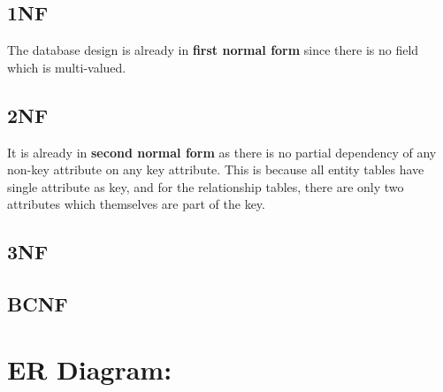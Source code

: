 \documentclass{article}
\begin{document}
\subsection{1NF} The database design is already in \textbf{first normal form} since there is no field which is multi-valued.
\subsection{2NF} It is already in \textbf{second normal form} as there is no partial dependency of any non-key attribute on any key attribute. This is because all entity tables have single attribute as key, and for the relationship tables, there are only two attributes which themselves are part of the key.
\subsection{3NF} 
\subsection{BCNF} 

\section{ER Diagram:}
\end{document}
